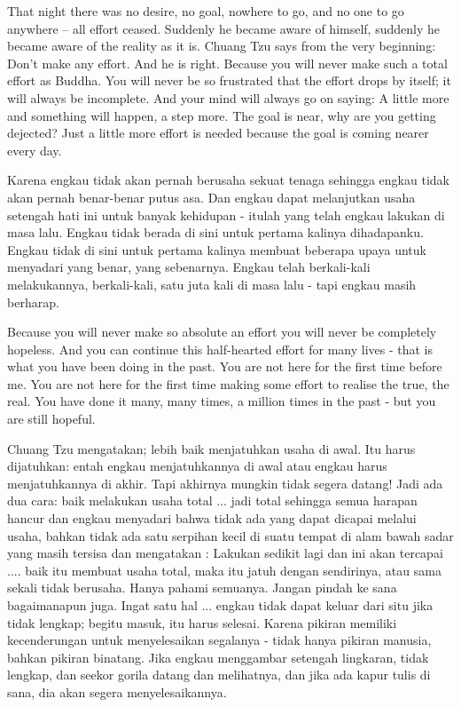 \english
That night there was no desire, no goal, nowhere to go, and no one to go anywhere – all effort ceased. Suddenly he became aware of himself, suddenly he became aware of the reality as it is. Chuang Tzu says from the very beginning: Don't make any effort. And he is right. Because you will never make such a total effort as Buddha. You will never be so frustrated that the effort drops by itself; it will always be incomplete. And your mind will always go on saying: A little more and something will happen, a step more. The goal is near, why are you getting dejected? Just a little more effort is needed because the goal is coming nearer every day.

\bahasa
Karena engkau tidak akan pernah berusaha sekuat tenaga sehingga engkau tidak akan pernah benar-benar putus asa. Dan engkau dapat melanjutkan usaha setengah hati ini untuk banyak kehidupan - itulah yang telah engkau lakukan di masa lalu. Engkau tidak berada di sini untuk pertama kalinya dihadapanku. Engkau tidak di sini untuk pertama kalinya membuat beberapa upaya untuk menyadari yang benar, yang sebenarnya. Engkau telah berkali-kali melakukannya, berkali-kali, satu juta kali di masa lalu - tapi engkau masih berharap.

\english
Because you will never make so absolute an effort you will never be completely hopeless. And you can continue this half-hearted effort for many lives - that is what you have been doing in the past. You are not here for the first time before me. You are not here for the first time making some effort to realise the true, the real. You have done it many, many times, a million times in the past - but you are still hopeful.

\bahasa
Chuang Tzu mengatakan; lebih baik menjatuhkan usaha di awal. Itu harus dijatuhkan: entah engkau menjatuhkannya di awal atau engkau harus menjatuhkannya di akhir. Tapi akhirnya mungkin tidak segera datang! Jadi ada dua cara: baik melakukan usaha total ... jadi total sehingga semua harapan hancur dan engkau menyadari bahwa tidak ada yang dapat dicapai melalui usaha, bahkan tidak ada satu serpihan kecil di suatu tempat di alam bawah sadar yang masih tersisa dan mengatakan : Lakukan sedikit lagi dan ini akan tercapai .... baik itu membuat usaha total, maka itu jatuh dengan sendirinya, atau sama sekali tidak berusaha. Hanya pahami semuanya. Jangan pindah ke sana bagaimanapun juga. Ingat satu hal ... engkau tidak dapat keluar dari situ jika tidak lengkap; begitu masuk, itu harus selesai. Karena pikiran memiliki kecenderungan untuk menyelesaikan segalanya - tidak hanya pikiran manusia, bahkan pikiran binatang. Jika engkau menggambar setengah lingkaran, tidak lengkap, dan seekor gorila datang dan melihatnya, dan jika ada kapur tulis di sana, dia akan segera menyelesaikannya.

